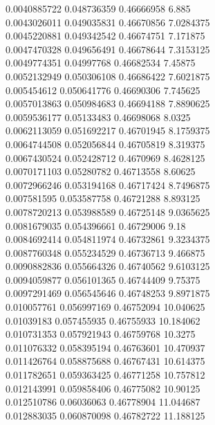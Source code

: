 {0.0040885722 0.048736359 0.46666958 6.885\\
0.0043026011 0.049035831 0.46670856 7.0284375\\
0.0045220881 0.049342542 0.46674751 7.171875\\
0.0047470328 0.049656491 0.46678644 7.3153125\\
0.0049774351 0.04997768 0.46682534 7.45875\\
0.0052132949 0.050306108 0.46686422 7.6021875\\
0.005454612 0.050641776 0.46690306 7.745625\\
0.0057013863 0.050984683 0.46694188 7.8890625\\
0.0059536177 0.05133483 0.46698068 8.0325\\
0.0062113059 0.051692217 0.46701945 8.1759375\\
0.0064744508 0.052056844 0.46705819 8.319375\\
0.0067430524 0.052428712 0.4670969 8.4628125\\
0.0070171103 0.05280782 0.46713558 8.60625\\
0.0072966246 0.053194168 0.46717424 8.7496875\\
0.007581595 0.053587758 0.46721288 8.893125\\
0.0078720213 0.053988589 0.46725148 9.0365625\\
0.0081679035 0.054396661 0.46729006 9.18\\
0.0084692414 0.054811974 0.46732861 9.3234375\\
0.0087760348 0.055234529 0.46736713 9.466875\\
0.0090882836 0.055664326 0.46740562 9.6103125\\
0.0094059877 0.056101365 0.46744409 9.75375\\
0.0097291469 0.056545646 0.46748253 9.8971875\\
0.010057761 0.056997169 0.46752094 10.040625\\
0.01039183 0.057455935 0.46755933 10.184062\\
0.010731353 0.057921943 0.46759768 10.3275\\
0.011076332 0.058395194 0.46763601 10.470937\\
0.011426764 0.058875688 0.46767431 10.614375\\
0.011782651 0.059363425 0.46771258 10.757812\\
0.012143991 0.059858406 0.46775082 10.90125\\
0.012510786 0.06036063 0.46778904 11.044687\\
0.012883035 0.060870098 0.46782722 11.188125\\
}
